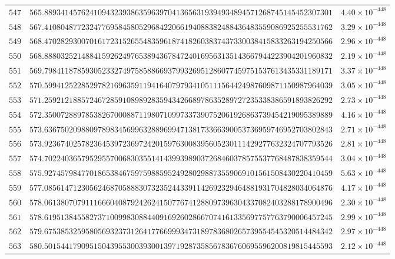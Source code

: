 \documentclass[12pt,reqno]{amsart}
\theoremstyle{remark}
\begin{document}
\begin{longtable}{clc}
$547$ & $565.8893414576241094323938635963970413656319394934894571268745145452307301$ & $4.40\times 10^{-448}$ \\
$548$ & $567.4108048772324776958458052968422066194088382488436483559086925255531762$ & $3.29\times 10^{-448}$ \\
$549$ & $568.4702829300701617231526554835961874182603837437330038415833263194250566$ & $2.96\times 10^{-448}$ \\
$550$ & $568.8880325214884159262497653894367847240169563135143667944223904201960832$ & $2.19\times 10^{-448}$ \\
$551$ & $569.7984118785930523327497585886693799326951286077459751537613435331189171$ & $3.37\times 10^{-448}$ \\
$552$ & $570.5994125228529782169635911941640797934105111564424987609871150987964039$ & $3.05\times 10^{-448}$ \\
$553$ & $571.2592121885724672859108989283594342668978635289727235338386591893826292$ & $2.73\times 10^{-448}$ \\
$554$ & $572.3500728897853826700088711980710997337390752061926863739454219095389889$ & $4.16\times 10^{-448}$ \\
$555$ & $573.6367502098809789834569963288969947138173366390053736959746952703802843$ & $2.71\times 10^{-448}$ \\
$556$ & $573.9236740257823645397236972420159763008395605230111429277632324707793526$ & $2.81\times 10^{-448}$ \\
$557$ & $574.7022403657952955700683035514143993989037268460378575537768487838359544$ & $3.04\times 10^{-448}$ \\
$558$ & $575.9274579847701865384675975988595249280298873559069101561508430220410459$ & $5.63\times 10^{-448}$ \\
$559$ & $577.0856147123056246870588830732352443391142692329464881931704828034064876$ & $4.17\times 10^{-448}$ \\
$560$ & $578.0613807079111666040879242624150776741288097396304337082403288178900496$ & $2.30\times 10^{-448}$ \\
$561$ & $578.6195138455827371009983088440916926028667074161335697757763790006457245$ & $2.99\times 10^{-448}$ \\
$562$ & $579.6753853259580569323731264177669993473189783680265739554545320514484342$ & $2.97\times 10^{-448}$ \\
$563$ & $580.5015441790951504395530039300139719287358567836760695596200819815445593$ & $2.12\times 10^{-448}$ \\

\end{longtable}
\end{document}
